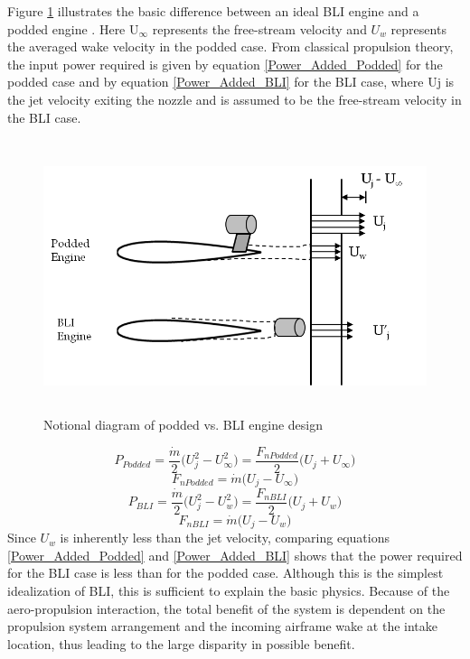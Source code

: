 \documentclass[12pt]{gatech-thesis}
\begin{document}
\indent Figure \ref{Podded_vs_Embedded_Engines} illustrates the basic difference between an ideal BLI engine and a podded engine \cite{PlasThesis}.  Here U$_\infty$ represents the free-stream velocity and $U_w$ represents the averaged wake velocity in the podded case. From classical propulsion theory, the input power required is given by equation \ref{Power_Added_Podded} for the podded case and by equation \ref{Power_Added_BLI} for the BLI case, where Uj is the jet velocity exiting the nozzle and is assumed to be the free-stream velocity in the BLI case.
    \begin{figure}
    \centering
    \includegraphics[width=140mm, height = 80mm, trim=0mm 0mm 0mm 0mm, clip=true]{Figure1_Podded_vs_Embedded_Engines.png}
    \caption{Notional diagram of podded vs. BLI engine design}
    \label{Podded_vs_Embedded_Engines}
    \end{figure}
\begin{equation}P_{Podded}= \frac{\dot{m}}{2}\big(U_j^2-U_\infty^2\big) = \frac{F_{n Podded}}{2}\big(U_j+U_\infty\big)\label{Power_Added_Podded}\end{equation}
\begin{equation}F_{n Podded}= \dot{m}\big(U_j-U_\infty\big) \label{Net_Thrust_Podded}\end{equation}
\begin{equation}P_{BLI}= \frac{\dot{m}}{2}\big(U_j^2-U_w^2\big) = \frac{F_{n BLI}}{2}\big(U_j +U_w\big)\label{Power_Added_BLI}\end{equation}
\begin{equation}F_{n BLI}= \dot{m}\big(U_j-U_w\big) \label{Net_Thrust_BLI}\end{equation}
Since $U_w$ is inherently less than the jet velocity, comparing equations \ref{Power_Added_Podded} and \ref{Power_Added_BLI} shows that the power required for the BLI case is less than for the podded case.  Although this is the simplest idealization of BLI, this is sufficient to explain the basic physics.  Because of the aero-propulsion interaction, the total benefit of the system is dependent on the propulsion system arrangement and the incoming airframe wake at the intake location, thus leading to the large disparity in possible benefit. 
\end{document}
